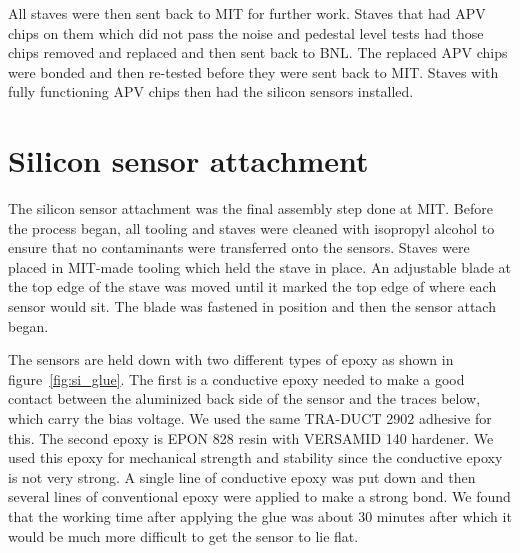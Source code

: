 \documentclass[preprint,12pt]{elsarticle}
\begin{document}
All staves were then sent back to MIT for further work. Staves that had APV
chips on them which did not pass the noise and pedestal level tests had
those chips removed and replaced and then sent back to BNL. The replaced APV
chips were bonded and then re-tested before they were sent back to MIT. Staves
with fully functioning APV chips then had the silicon sensors installed.

\section{Silicon sensor attachment}
The silicon sensor attachment was the final assembly step done at MIT. Before the
process began, all tooling and staves were cleaned with isopropyl alcohol to
ensure that no contaminants were transferred onto the sensors. Staves were placed
in MIT-made tooling which held the stave in place. An adjustable blade at the
top edge of the stave was moved until it marked the top edge of where each sensor
would sit. The blade was fastened in position and then the sensor attach
began.

The sensors are held down with two different types of epoxy as shown in figure~\ref{fig:si_glue}. The first is a
conductive epoxy needed to make a good contact between the aluminized back side
of the sensor and the traces below, which carry the bias voltage. We used the
same TRA-DUCT 2902 adhesive for this. The second epoxy is EPON 828 resin with
VERSAMID 140 hardener. We used this epoxy for mechanical strength and stability since the
conductive epoxy is not very strong. A single line of conductive epoxy was put
down and then several lines of conventional epoxy were applied to make a strong
bond. We found that the working time after applying the glue was about 30
minutes after which it would be much more difficult to get the sensor to lie
flat.
\end{document}
